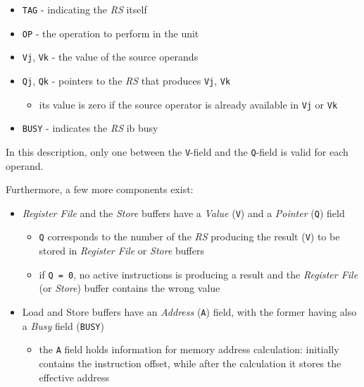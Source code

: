 \documentclass[english]{article}
\begin{document}
\begin{itemize}
  \item \texttt{TAG} - indicating the \textit{RS} itself
  \item \texttt{OP} - the operation to perform in the unit
  \item \texttt{Vj}, \texttt{Vk} - the value of the source operands
  \item \texttt{Qj}, \texttt{Qk} - pointers to the \textit{RS} that produces \texttt{Vj}, \texttt{Vk}
        \begin{itemize}
          \item its value is zero if the source operator is already available in \texttt{Vj} or \texttt{Vk}
        \end{itemize}
  \item \texttt{BUSY} - indicates the \textit{RS} ib busy
\end{itemize}

In this description, only one between the \texttt{V}-field and the \texttt{Q}-field is valid for each operand.

\bigskip
Furthermore, a few more components exist:

\begin{itemize}
  \item \textit{Register File} and the \textit{Store} buffers have a \textit{Value} (\texttt{V}) and a \textit{Pointer} (\texttt{Q}) field
        \begin{itemize}
          \item  \texttt{Q} corresponds to the number of the \textit{RS} producing the result (\texttt{V}) to be stored in \textit{Register File} or \textit{Store} buffers
          \item if \texttt{Q = 0}, no active instructions is producing a result and the \textit{Register File} (or \textit{Store}) buffer contains the wrong value
        \end{itemize}
  \item Load and Store buffers have an \textit{Address} (\texttt{A}) field, with the former having also a \textit{Busy} field (\texttt{BUSY})
        \begin{itemize}
          \item the \texttt{A} field holds information for memory address calculation: initially contains the instruction offset, while after the calculation it stores the effective address
        \end{itemize}
\end{itemize}
\end{document}
